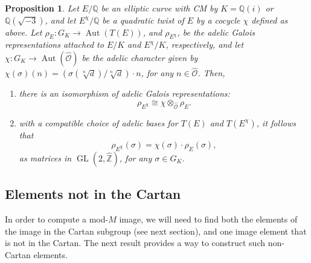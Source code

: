 \documentclass[11pt]{amsart}
\newtheorem{lemma}[defn]{Lemma}
\newtheorem{prop}[defn]{Proposition}
\theoremstyle{definition}
\newcommand{\Q}{\mathbb{Q}}
\newcommand{\Z}{\mathbb{Z}}
\newcommand{\Of}{\mathcal{O}_{K,f}}
\newcommand{\Aut}{\operatorname{Aut}}
\newcommand{\GL}{\operatorname{GL}}
\begin{document}
\begin{prop}
\label{cpx_conj_lemma3}\label{cpx_conj_prop3}
Let $E/\Q$ be an elliptic curve with CM by $K=\Q(i)$ or $\Q(\sqrt{-3})$, and let $E^{\chi}/\Q$ be a quadratic twist of $E$ by a cocycle $\chi$ defined as above. Let $\rho_{E} \colon G_K \to \Aut(T(E))$, and $\rho_{E^\chi}$, be the adelic Galois representations attached to $E/K$ and $E^\chi/K$, respectively, and let $\chi\colon G_K \to \Aut(\widehat{\mathcal{O}})$ be the adelic character given by $\chi(\sigma)(n) = (\sigma(\sqrt[n]{d})/\sqrt[n]{d})\cdot n$, for any $n\in \widehat{\mathcal{O}}$. Then, 
\begin{enumerate}
    \item there is an isomorphism of adelic Galois representations:
\[ \rho_{E^{\chi}} \cong \chi \otimes_{\widehat{\mathcal{O}}} \rho_{E}. \]
    \item with a compatible choice of adelic bases for $T(E)$ and $T(E^\chi)$, it follows that 
    $$\rho_{E^\chi}(\sigma) = \chi(\sigma)\cdot \rho_{E}(\sigma),$$
as matrices in $\GL(2,\widehat{\Z})$, for any $\sigma \in G_K$.
\end{enumerate}
\end{prop}




\subsection{Elements not in the Cartan}

In order to compute a mod-$M$ image, we will need to find both the elements of the image in the Cartan subgroup (see next section), and one image element that is not in the Cartan. The next result provides a way to construct such non-Cartan elements.
\end{document}
